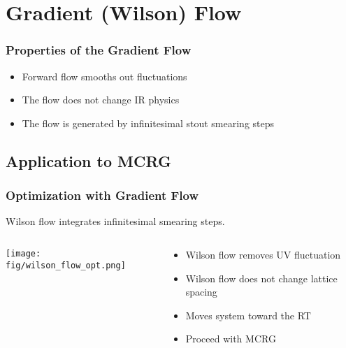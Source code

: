 
\section{Gradient (Wilson) Flow}
\addtocounter{framenumber}{-1}

\begin{frame}
  \frametitle{Properties of the Gradient Flow}
  \begin{itemize}
    \item Forward flow smooths out fluctuations
    \item The flow does not change IR physics
    \item The flow is generated by infinitesimal stout smearing steps
  \end{itemize}
\end{frame}

\subsection{Application to MCRG}
\addtocounter{framenumber}{-1}

\begin{frame}
  \frametitle{Optimization with Gradient Flow}
  Wilson flow integrates infinitesimal smearing steps.
  \begin{columns}[T]
    \begin{column}{.4\textwidth}
      \begin{block}{}
        \texttt{[image: fig/wilson\_flow\_opt.png]}
      \end{block}
    \end{column}
    \begin{column}{.6\textwidth}
      \begin{block}{}
        \begin{itemize}
          \item Wilson flow removes UV fluctuation
          \item Wilson flow does not change lattice spacing
          \item Moves system toward the RT
          \item Proceed with MCRG
        \end{itemize}
      \end{block}
    \end{column}
  \end{columns}
\end{frame}

